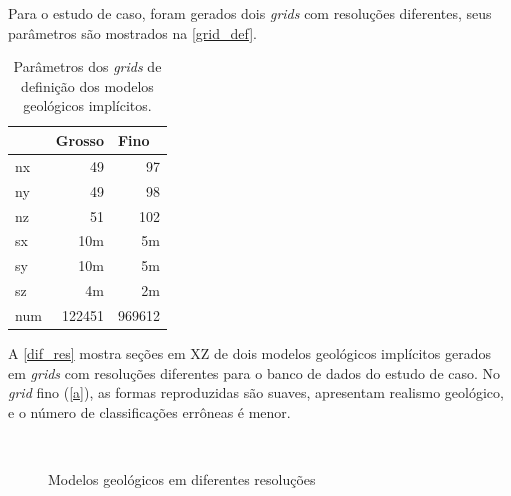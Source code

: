 Para o estudo de caso, foram gerados dois \textit{grids} com resoluções diferentes, seus parâmetros são mostrados na \autoref{grid_def}.

\begin{table}[H]
\centering
\begin{tabular}{lrr}
 & \multicolumn{1}{l}{Grosso} & \multicolumn{1}{l}{Fino} \\ \hline
nx & 49 & 97 \\
ny & 49 & 98 \\
nz & 51 & 102 \\
sx & 10m & 5m \\
sy & 10m & 5m \\
sz & 4m & 2m \\
num & 122451 & 969612 \\ \hline
\end{tabular}
\caption{Parâmetros dos \textit{grids} de definição dos modelos geológicos implícitos.} \label{grid_def}
\end{table}

A \autoref{dif_res} mostra seções em XZ de dois modelos geológicos implícitos gerados em \textit{grids} com resoluções diferentes para o banco de dados do estudo de caso. No \textit{grid} fino (\autoref{a}), as formas reproduzidas são suaves, apresentam realismo geológico, e o número de classificações errôneas é menor.

\begin{figure}[H]
\caption{Modelos geológicos em diferentes resoluções} 
\label{dif_res}
\begin{center}
\\
\end{center}
\begin{center}
\end{center}
\end{figure}

